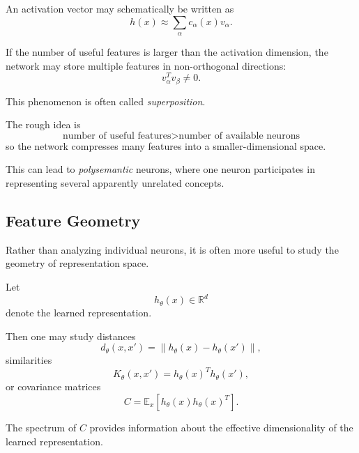 An activation vector may schematically be written as
\begin{equation}
    h(x)
    \approx
    \sum_\alpha
    c_\alpha(x)v_\alpha.
\end{equation}

If the number of useful features is larger than the activation dimension, the
network may store multiple features in non-orthogonal directions:
\begin{equation}
    v_\alpha^T v_\beta
    \neq 0.
\end{equation}

This phenomenon is often called \emph{superposition}.

The rough idea is
\begin{equation}
    \boxed{
    \text{number of useful features}
    >
    \text{number of available neurons}
    }
\end{equation}
so the network compresses many features into a smaller-dimensional space.

This can lead to \emph{polysemantic} neurons, where one neuron participates in
representing several apparently unrelated concepts.


\subsection{Feature Geometry}

Rather than analyzing individual neurons, it is often more useful to study the
geometry of representation space.

Let
\begin{equation}
    h_\theta(x)\in\mathbb R^d
\end{equation}
denote the learned representation.

Then one may study distances
\begin{equation}
    d_\theta(x,x')
    =
    \left\|
        h_\theta(x)-h_\theta(x')
    \right\|,
\end{equation}
similarities
\begin{equation}
    K_\theta(x,x')
    =
    h_\theta(x)^T h_\theta(x'),
\end{equation}
or covariance matrices
\begin{equation}
    C
    =
    \mathbb E_x
    \left[
        h_\theta(x)h_\theta(x)^T
    \right].
\end{equation}

The spectrum of $C$ provides information about the effective dimensionality of
the learned representation.


